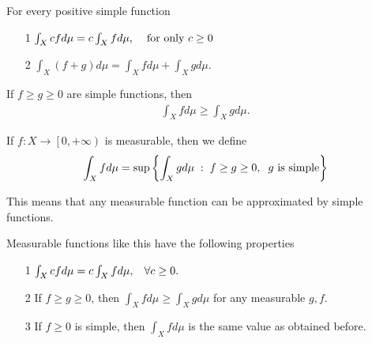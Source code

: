 \begin{properties}
    For every positive simple function
    \begin{center}
\begin{itemize}
    \item[1] $\int_X cfd\mu = c\int_Xfd\mu,\hspace{4mm}\text{for only } c\geq 0$
    \item[2] $\int_X(f+g)d\mu = \int_Xfd\mu + \int_X gd\mu$.
\end{itemize}
\end{center}
\end{properties}

\begin{corollary}
    If $f\geq g\geq 0$ are simple functions, then 
    \begin{align}
        \int_X fd\mu \geq \int_X g d\mu.
    \end{align}
\end{corollary}

\begin{definition}
    If $f:X\rightarrow \left[0,+\infty\right)$ is measurable, then we define 
    \begin{align}
        \int_X fd\mu = \sup\left\{  \int_X gd\mu \hspace{1mm} :\hspace{1mm} f\geq g\geq 0,\hspace{2mm} g\text{ is simple}\right\}
    \end{align}
\end{definition}
\begin{remark}
    This means that any measurable function can be approximated by simple functions.
\end{remark}

\begin{properties}
    Measurable functions like this have the following properties 
    \begin{itemize}
        \item[1] $\int_X cfd\mu = c\int_X fd\mu,\hspace{3mm} \forall c\geq 0. $
        \item[2] If $f\geq g\geq 0$, then $\int_X fd\mu\geq\int_X gd\mu$ for any measurable $g,f$.
        \item[3] If $f\geq 0$ is simple, then $\int_X fd\mu $ is the same value as obtained before.    
    \end{itemize}
\end{properties}

